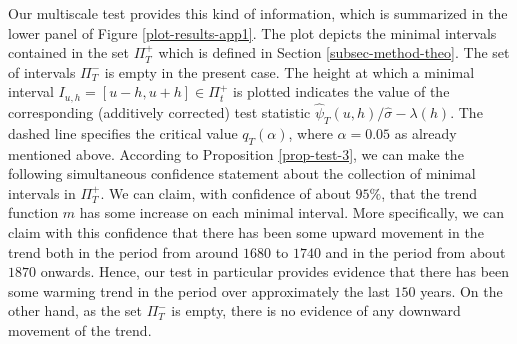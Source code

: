 Our multiscale test provides this kind of information, which is summarized in the lower panel of Figure \ref{plot-results-app1}. The plot depicts the minimal intervals contained in the set $\Pi_T^+$ which is defined in Section \ref{subsec-method-theo}. The set of intervals $\Pi_T^-$ is empty in the present case. The height at which a minimal interval $I_{u,h} = [u-h,u+h] \in \Pi_t^+$ is plotted indicates the value of the corresponding (additively corrected) test statistic $\widehat{\psi}_T(u,h) / \widehat{\sigma} - \lambda(h)$. The dashed line specifies the critical value $q_T(\alpha)$, where $\alpha = 0.05$ as already mentioned above. According to Proposition \ref{prop-test-3}, we can make the following simultaneous confidence statement about the collection of minimal intervals in $\Pi_T^+$. We can claim, with confidence of about $95\%$, that the trend function $m$ has some increase on each minimal interval. More specifically, we can claim with this confidence that there has been some upward movement in the trend both in the period from around $1680$ to $1740$ and in the period from about $1870$ onwards. Hence, our test in particular provides evidence that there has been some warming trend in the period over approximately the last $150$ years. On the other hand, as the set $\Pi_T^-$ is empty, there is no evidence of any downward movement of the trend.
